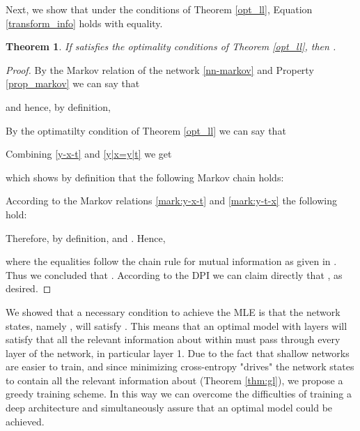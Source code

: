 \documentclass{article}
\newtheorem{theorem}{Theorem}
\newtheorem{proof}{Proof}
\newtheorem{comment}{Comment}
\begin{document}
Next, we show that under the conditions of Theorem \eqref{opt_ll}, Equation \eqref{transform_info} holds with equality.
\begin{theorem} \label{thm:gl}
    If  satisfies the optimality conditions of Theorem \eqref{opt_ll}, then .
\end{theorem}
\begin{proof}
By the Markov relation of the network \eqref{nn-markov} and Property \eqref{prop_markov} we can say that

and hence, by definition,
 
By the optimatilty condition of Theorem \eqref{opt_ll} we can say that 
 
Combining \eqref{y-x-t} and \eqref{y|x=y|t} we get
 
which shows by definition that the following Markov chain holds:
 
According to the Markov relations \eqref{mark:y-x-t} and \eqref{mark:y-t-x} the following hold:

Therefore, by definition,  and . Hence, 

where the equalities follow the chain rule for mutual information as given in \cite[Section~2.5.2]{cover2012elements}. 
Thus we concluded that . According to the DPI we can claim directly that  , as desired. 
\end{proof}

We showed that a necessary condition to achieve the MLE is that the network states, namely , will satisfy . 
This means that an optimal model with  layers will satisfy that all the relevant information about  within  must pass through every layer of the network, in particular layer 1. 
Due to the fact that shallow networks are easier to train, and since minimizing cross-entropy "drives" the network states to contain all the relevant information about  (Theorem \eqref{thm:gl}), we propose a greedy training scheme. 
In this way we can overcome the difficulties of training a deep architecture and simultaneously assure that an optimal model could be achieved.

\begin{comment}
    We cannot guarantee that after training a layer, say layer , the negative log likelihood is minimized, either because of the model limitation or because the optimization yielded a local minimum and not a global one. 
    Hence, we cannot claim  that we maximized the mutual information between  and . 
    But since this is a necessary condition to achieve the optimal condition of Theorem \eqref{opt_ll} (and not a sufficient condition), we assume that by the end of training, when the negative log-likelihood is small,  is maximized (or relatively close to it).
\end{comment}
\end{document}
